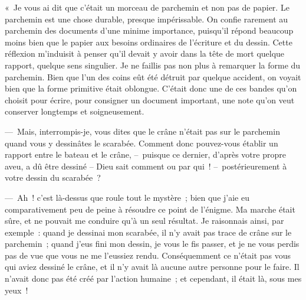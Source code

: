 \documentclass[french,twoside]{book} %
\begin{document}
« Je vous ai dit que c’était un morceau de parchemin et non pas de papier. Le parchemin est une chose durable, presque impérissable. On confie rarement au parchemin des documents d’une minime importance, puisqu’il répond beaucoup moins bien que le papier aux besoins ordinaires de l’écriture et du dessin. Cette réflexion m’induisit à penser qu’il devait y avoir dans la tête de mort quelque rapport, quelque sens singulier. Je ne faillis pas non plus à remarquer la forme du parchemin. Bien que l’un des coins eût été détruit par quelque accident, on voyait bien que la forme primitive était oblongue. C’était donc une de ces bandes qu’on choisit pour écrire, pour consigner un document important, une note qu’on veut conserver longtemps et soigneusement.\par
— Mais, interrompis-je, vous dites que le crâne n’était pas sur le parchemin quand vous y dessinâtes le scarabée. Comment donc pouvez-vous établir un rapport entre le bateau et le crâne, – puisque ce dernier, d’après votre propre aveu, a dû être dessiné – Dieu sait comment ou par qui ! – postérieurement à votre dessin du scarabée ?\par
— Ah ! c’est là-dessus que roule tout le mystère ; bien que j’aie eu comparativement peu de peine à résoudre ce point de l’énigme. Ma marche était sûre, et ne pouvait me conduire qu’à un seul résultat. Je raisonnais ainsi, par exemple : quand je dessinai mon scarabée, il n’y avait pas trace de crâne sur le parchemin ; quand j’eus fini mon dessin, je vous le fis passer, et je ne vous perdis pas de vue que vous ne me l’eussiez rendu. Conséquemment ce n’était pas vous qui aviez dessiné le crâne, et il n’y avait là aucune autre personne pour le faire. Il n’avait donc pas été créé par l’action humaine ; et cependant, il était là, sous mes yeux !\par
\end{document}
